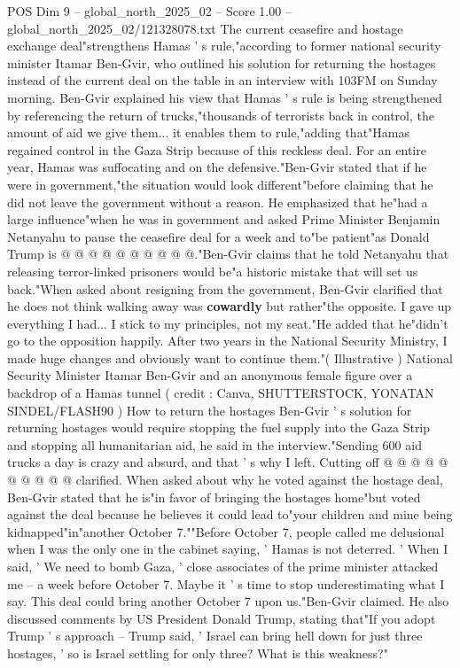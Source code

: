 \begin{textsample}{POS Dim 9 – global\_north\_2025\_02 – Score 1.00 – global\_north\_2025\_02/121328078.txt}  \label{ex:f9_pos_439}
The current ceasefire and hostage exchange deal"strengthens Hamas ' s rule,"according to former national security minister Itamar Ben-Gvir, who outlined his solution for returning the hostages instead of the current deal on the table in an interview with 103FM on Sunday morning.
Ben-Gvir explained his view that Hamas ' s rule is being strengthened by referencing the return of trucks,"thousands of terrorists back in control, the amount of aid we give them... it enables them to rule,"adding that"Hamas regained control in the Gaza Strip because of this reckless deal.
For an entire year, Hamas was suffocating and on the defensive."Ben-Gvir stated that if he were in government,"the situation would look different"before claiming that he did not leave the government without a reason.
He emphasized that he"had a large influence"when he was in government and asked Prime Minister Benjamin Netanyahu to pause the ceasefire deal for a week and to"be patient"as Donald Trump is @ @ @ @ @ @ @ @ @ @."Ben-Gvir claims that he told Netanyahu that releasing terror-linked prisoners would be"a historic mistake that will set us back."When asked about resigning from the government, Ben-Gvir clarified that he does not think walking away was \textbf{cowardly} but rather"the opposite.
I gave up everything I had...
I stick to my principles, not my seat."He added that he"didn't go to the opposition happily.
After two years in the National Security Ministry, I made huge changes and obviously want to continue them."( Illustrative ) National Security Minister Itamar Ben-Gvir and an anonymous female figure over a backdrop of a Hamas tunnel ( credit : Canva, SHUTTERSTOCK, YONATAN SINDEL/FLASH90 ) How to return the hostages Ben-Gvir ' s solution for returning hostages would require stopping the fuel supply into the Gaza Strip and stopping all humanitarian aid, he said in the interview."Sending 600 aid trucks a day is crazy and absurd, and that ' s why I left.
Cutting off @ @ @ @ @ @ @ @ @ @ clarified.
When asked about why he voted against the hostage deal, Ben-Gvir stated that he is"in favor of bringing the hostages home"but voted against the deal because he believes it could lead to"your children and mine being kidnapped"in"another October 7.""Before October 7, people called me delusional when I was the only one in the cabinet saying, ' Hamas is not deterred. ' When I said, ' We need to bomb Gaza, ' close associates of the prime minister attacked me -- a week before October 7.
Maybe it ' s time to stop underestimating what I say.
This deal could bring another October 7 upon us."Ben-Gvir claimed.
He also discussed comments by US President Donald Trump, stating that"If you adopt Trump ' s approach -- Trump said, ' Israel can bring hell down for just three hostages, ' so is Israel settling for only three?
What is this weakness?"

\end{textsample}
